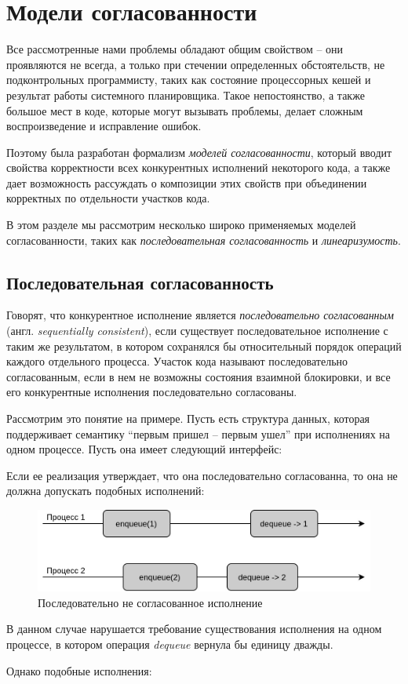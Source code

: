 \documentclass[14pt, openany]{book}
\begin{document}
\section{Модели согласованности}
Все рассмотренные нами проблемы обладают общим свойством -- они проявляются не всегда, а только при стечении определенных обстоятельств, не подконтрольных программисту, таких как состояние процессорных кешей и результат работы системного планировщика. Такое непостоянство, а также большое мест в коде, которые могут вызывать проблемы, делает сложным воспроизведение и исправление ошибок. \par
Поэтому была разработан формализм \textit{моделей согласованности}, который вводит свойства корректности всех конкурентных исполнений некоторого кода, а также дает возможность рассуждать о композиции этих свойств при объединении корректных по отдельности участков кода. \par
В этом разделе мы рассмотрим несколько широко применяемых моделей согласованности, таких как \textit{последовательная согласованность} и \textit{линеаризумость}.

\subsection{Последовательная согласованность}
Говорят, что конкурентное исполнение является \textit{последовательно согласованным} (англ. \textit{sequentially consistent}), если существует последовательное исполнение с таким же результатом, в котором сохранялся бы относительный порядок операций каждого отдельного процесса. Участок кода называют последовательно согласованным, если в нем не возможны состояния взаимной блокировки, и все его конкурентные исполнения последовательно согласованы. \cite{sequential} \par
Рассмотрим это понятие на примере. Пусть есть структура данных, которая поддерживает семантику ``первым пришел -- первым ушел''  при исполнениях на одном процессе. Пусть она имеет следующий интерфейс:

Если ее реализация утверждает, что она последовательно согласованна, то она не должна допускать подобных исполнений: 

\begin{figure}[h]
\caption{Последовательно не согласованное исполнение}
\vspace{2mm}
\centering
\includegraphics[scale=0.4]{NonSequential.jpg}
\end{figure}
В данном случае нарушается требование существования исполнения на одном процессе, в котором операция \textit{dequeue} вернула бы единицу дважды. \par
Однако подобные исполнения: 
\end{document}

